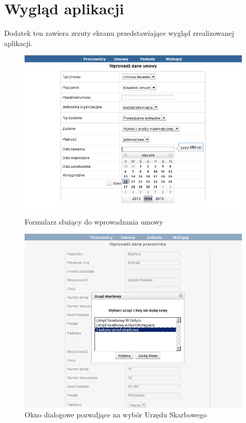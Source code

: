\chapter{Wygląd aplikacji}
Dodatek ten zawiera zrzuty ekranu przedstawiające wygląd zrealizowanej aplikacji.

\begin{figure}[]
    \begin{center}
	\includegraphics[scale=1,angle=-90]{img/screen1.png}
	\caption{Formularz służący do wprowadzania umowy}
	\label{screen1}
    \end{center}
\end{figure}

\begin{figure}[]
    \begin{center}
	\includegraphics[scale=1,angle=-90]{img/screen2.png}
	\caption{Okno dialogowe pozwaljące na wybór Urzędu Skarbowego}
	\label{screen2}
    \end{center}
\end{figure}

